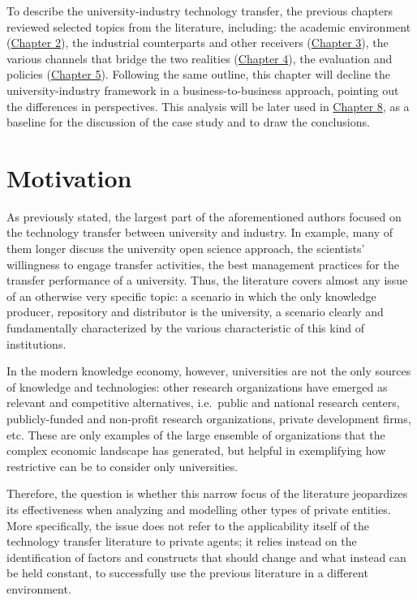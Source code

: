 

To describe the university-industry technology transfer, the previous chapters reviewed selected topics from the literature, including: the academic environment (\hyperref[Chapter2]{Chapter 2}), the industrial counterparts and other receivers (\hyperref[Chapter3]{Chapter 3}), the various channels that bridge the two realities (\hyperref[Chapter4]{Chapter 4}), the evaluation and policies (\hyperref[Chapter5]{Chapter 5}). Following the same outline, this chapter will decline the university-industry framework in a business-to-business approach, pointing out the differences in perspectives. This analysis will be later used in \hyperref[Chapter8]{Chapter 8}, as a baseline for the discussion of the case study and to draw the conclusions. 

\label{Chapter6}

\section{Motivation}

As previously stated, the largest part of the aforementioned authors focused on the technology transfer between university and industry. In example, many of them longer discuss the university open science approach, the scientists' willingness to engage transfer activities, the best management practices for the transfer performance of a university. Thus, the literature covers almost any issue of an otherwise very specific topic: a scenario in which the only knowledge producer, repository and distributor is the university, a scenario clearly and fundamentally characterized by the various characteristic of this kind of institutions.

In the modern knowledge economy, however, universities are not the only sources of knowledge and technologies: other research organizations have emerged as relevant and competitive alternatives, i.e.\ public and national research centers, publicly-funded and non-profit research organizations, private development firms, etc. These are only examples of the large ensemble of organizations that the complex economic landscape has generated, but helpful in exemplifying how restrictive can be to consider only universities.

Therefore, the question is whether this narrow focus of the literature jeopardizes its effectiveness when analyzing and modelling other types of private entities. More specifically, the issue does not refer to the applicability itself of the technology transfer literature to private agents; it relies instead on the identification of factors and constructs that should change and what instead can be held constant, to successfully use the previous literature in a different environment.


